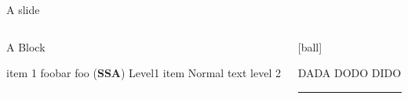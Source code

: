 \documentclass[9pt]{beamer}
\begin{document}
\begin{frame}{A slide}
    \begin{columns}[T]
        \begin{column}{0.45\textwidth} 
            \begin{alertblock}{A Block}   
                \begin{outline}       
                \1 item 1 
                \1 foobar foo (\textbf{SSA})
                \1 Level1 item
                \2 Normal text level 2
                \end{outline}
            \end{alertblock}        
        \end{column}     
        \begin{column}{0.5\textwidth}
            [ball]
            \begin{outline}
                \1 DADA
                \1 DODO
                \1 DIDO
            \end{outline}
            \begin{center}
               \rule{\textwidth}{5cm}
            \end{center}
       \end{column}
    \end{columns}
\end{frame}
\end{document}
